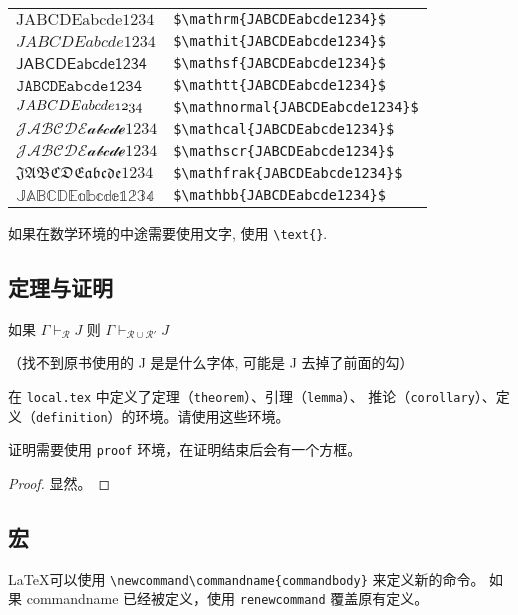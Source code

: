 \begin{tabular}{ll}
$\mathrm{JABCDEabcde1234}$      &  \verb!$\mathrm{JABCDEabcde1234}$!     \\
$\mathit{JABCDEabcde1234}$      &  \verb!$\mathit{JABCDEabcde1234}$!     \\
$\mathsf{JABCDEabcde1234}$      &  \verb!$\mathsf{JABCDEabcde1234}$!     \\
$\mathtt{JABCDEabcde1234}$      &  \verb!$\mathtt{JABCDEabcde1234}$!     \\
$\mathnormal{JABCDEabcde1234}$  &  \verb!$\mathnormal{JABCDEabcde1234}$! \\
$\mathcal{JABCDEabcde1234}$     &  \verb!$\mathcal{JABCDEabcde1234}$!    \\
$\mathscr{JABCDEabcde1234}$     &  \verb!$\mathscr{JABCDEabcde1234}$!    \\
$\mathfrak{JABCDEabcde1234}$    &  \verb!$\mathfrak{JABCDEabcde1234}$!   \\
$\mathbb{JABCDEabcde1234}$      &  \verb!$\mathbb{JABCDEabcde1234}$!     \\
\end{tabular}

如果在数学环境的中途需要使用文字, 使用 \verb!\text{}!.

\subsection{定理与证明}

\begin{theorem}[稳定性]\label{theorem:stability}
 如果 $\Gamma \vdash_{\mathcal{R}} J$ 则 $\Gamma \vdash_{\mathcal{R} \cup \mathcal{R}'} J$
\end{theorem}

（找不到原书使用的 J 是是什么字体, 可能是 J 去掉了前面的勾）

在 \texttt{local.tex} 中定义了定理（\texttt{theorem}）、引理（\texttt{lemma}）、
推论（\texttt{corollary}）、定义（\texttt{definition}）的环境。请使用这些环境。


证明需要使用 \texttt{proof} 环境，在证明结束后会有一个方框。
\begin{proof}
    显然。
\end{proof}


\subsection{宏}

\LaTeX 可以使用 \verb!\newcommand\commandname{commandbody}! 来定义新的命令。
如果 commandname 已经被定义，使用 \verb!renewcommand! 覆盖原有定义。

